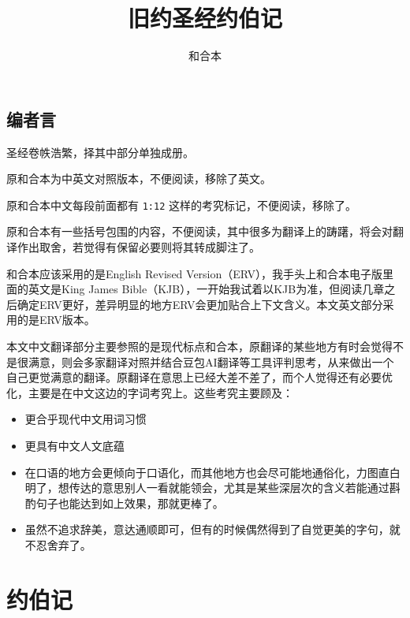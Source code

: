 \documentclass[12pt,oneside]{book}
\title{旧约圣经约伯记}
\author{和合本}
\begin{document}





\frontmatter
{}
\chapter*{编者言}
圣经卷帙浩繁，择其中部分单独成册。

原和合本为中英文对照版本，不便阅读，移除了英文。

原和合本中文每段前面都有 \verb+1:12+ 这样的考究标记，不便阅读，移除了。

原和合本有一些括号包围的内容，不便阅读，其中很多为翻译上的踌躇，将会对翻译作出取舍，若觉得有保留必要则将其转成脚注了。

和合本应该采用的是English Revised Version（ERV），我手头上和合本电子版里面的英文是King James Bible（KJB），一开始我试着以KJB为准，但阅读几章之后确定ERV更好，差异明显的地方ERV会更加贴合上下文含义。本文英文部分采用的是ERV版本。

本文中文翻译部分主要参照的是现代标点和合本，原翻译的某些地方有时会觉得不是很满意，则会多家翻译对照并结合豆包AI翻译等工具评判思考，从来做出一个自己更觉满意的翻译。原翻译在意思上已经大差不差了，而个人觉得还有必要优化，主要是在中文这边的字词考究上。这些考究主要顾及：

\begin{itemize}
\item 更合乎现代中文用词习惯
\item 更具有中文人文底蕴
\item 在口语的地方会更倾向于口语化，而其他地方也会尽可能地通俗化，力图直白明了，想传达的意思别人一看就能领会，尤其是某些深层次的含义若能通过斟酌句子也能达到如上效果，那就更棒了。
\item 虽然不追求辞美，意达通顺即可，但有的时候偶然得到了自觉更美的字句，就不忍舍弃了。
\end{itemize}



\setcounter{tocdepth}{2}    
\tableofcontents

\mainmatter
\part{约伯记}
\end{document}
